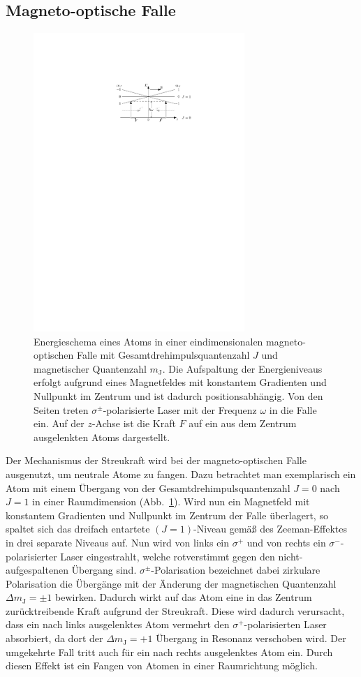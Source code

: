 \documentclass[twocolumn]{revtex4}
\begin{document}
\subsection{Magneto-optische Falle}
\begin{figure}[t]
	\centering
	\vspace{0.5cm}
	\includegraphics[width=80mm]{./figures/mot_gesamt_resize.pdf}
	\caption{Energieschema eines Atoms in einer eindimensionalen magneto-optischen Falle mit Gesamtdrehimpulsquantenzahl $J$ und magnetischer Quantenzahl $m_\mathrm{J}$. Die Aufspaltung der Energieniveaus erfolgt aufgrund eines Magnetfeldes mit konstantem Gradienten und Nullpunkt im Zentrum und ist dadurch positionsabhängig. Von den Seiten treten $\sigma^\pm$-polarisierte Laser mit der Frequenz $\omega$ in die Falle ein. Auf der $z$-Achse ist die Kraft $F$ auf ein aus dem Zentrum ausgelenkten Atoms dargestellt.}
	\label{fig:mot}
	\vspace{-0.8cm}
\end{figure}
Der Mechanismus der Streukraft wird bei der magneto-optischen Falle ausgenutzt, um neutrale Atome zu fangen.
Dazu betrachtet man exemplarisch ein Atom mit einem Übergang von der Gesamtdrehimpulsquantenzahl $J=0$ nach $J=1$ in einer Raumdimension (Abb.~\ref{fig:mot}).
Wird nun ein Magnetfeld mit konstantem Gradienten und Nullpunkt im Zentrum der Falle überlagert, so spaltet sich das dreifach entartete $(J=1)$-Niveau gemäß des Zeeman-Effektes in drei separate Niveaus auf.
Nun wird von links ein $\sigma^+$ und von rechts ein $\sigma^-$-polarisierter Laser eingestrahlt, welche rotverstimmt gegen den nicht-aufgespaltenen Übergang sind.
$\sigma^\pm$-Polarisation bezeichnet dabei zirkulare Polarisation die Übergänge mit der Änderung der magnetischen Quantenzahl $\Delta m_\mathrm{J} = \pm 1$ bewirken.
Dadurch wirkt auf das Atom eine in das Zentrum zurücktreibende Kraft aufgrund der Streukraft.
Diese wird dadurch verursacht, dass ein nach links ausgelenktes Atom vermehrt den $\sigma^+$-polarisierten Laser absorbiert, da dort der $\Delta m_\mathrm{J} = +1$ Übergang in Resonanz verschoben wird. Der umgekehrte Fall tritt auch für ein nach rechts ausgelenktes Atom ein.
Durch diesen Effekt ist ein Fangen von Atomen in einer Raumrichtung möglich.
\end{document}
